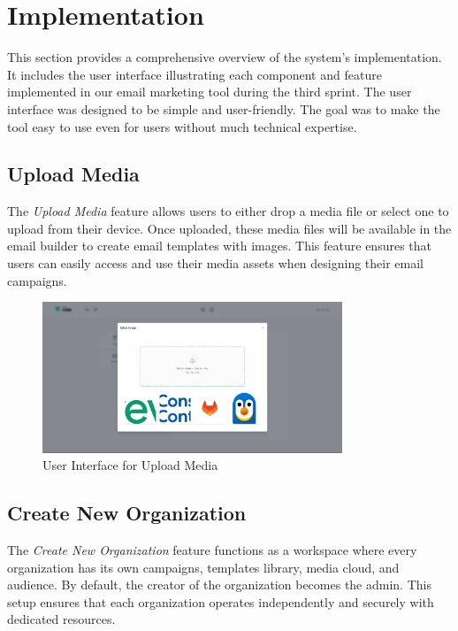 \clearpage

\section{Implementation}

This section provides a comprehensive overview of the system's implementation. It includes the user interface illustrating each component and feature implemented in our email marketing tool during the third sprint. The user interface was designed to be simple and user-friendly. The goal was to make the tool easy to use even for users without much technical expertise.

\subsection{Upload Media}
The \textit{Upload Media} feature allows users to either drop a media file or select one to upload from their device. Once uploaded, these media files will be available in the email builder to create email templates with images. This feature ensures that users can easily access and use their media assets when designing their email campaigns.

\begin{figure}[ht]
\centering
\includegraphics[width=0.8\textwidth]{Images/sprint2/screenshots/Screenshot 2024-06-06 004807.png}
\caption{User Interface for Upload Media}
\end{figure}

\subsection{Create New Organization}
The \textit{Create New Organization} feature functions as a workspace where every organization has its own campaigns, templates library, media cloud, and audience. By default, the creator of the organization becomes the admin. This setup ensures that each organization operates independently and securely with dedicated resources.

